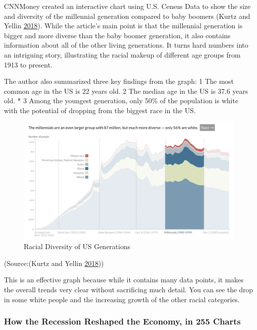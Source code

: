 \documentclass[]{book}
\begin{document}
CNNMoney created an interactive chart using U.S. Census Data to show the
size and diversity of the millennial generation compared to baby boomers
(Kurtz and Yellin \protect\hyperlink{ref-age_groups}{2018}). While the
article's main point is that the millennial generation is bigger and
more diverse than the baby boomer generation, it also contains
information about all of the other living generations. It turns hard
numbers into an intriguing story, illustrating the racial makeup of
different age groups from 1913 to present.

The author also summarized three key findings from the graph:
1\textbar{} The most common age in the US is 22 years old. 2\textbar{}
The median age in the US is 37.6 years old. * 3\textbar{} Among the
youngest generation, only 50\% of the population is white with the
potential of dropping from the biggest race in the US.

\begin{figure}
\centering
\includegraphics{images/millenials_diversity.png}
\caption{Racial Diversity of US Generations}
\end{figure}

(Source:(Kurtz and Yellin \protect\hyperlink{ref-age_groups}{2018}))

This is an effective graph because while it contains many data points,
it makes the overall trends very clear without sacrificing much detail.
You can see the drop in some white people and the increasing growth of
the other racial categories.

\subsubsection{How the Recession Reshaped the Economy, in 255
Charts}\label{how-the-recession-reshaped-the-economy-in-255-charts}
\end{document}
